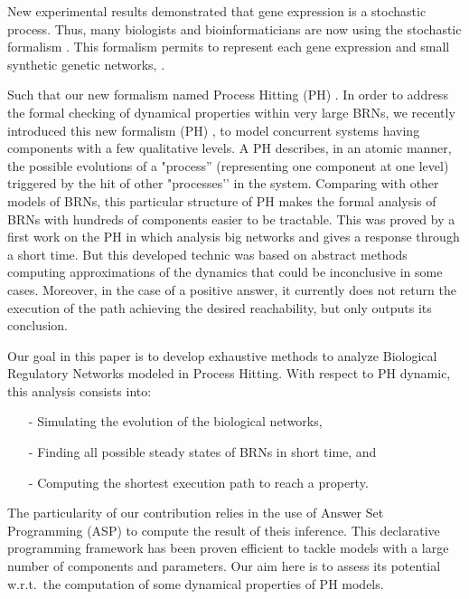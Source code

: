 New experimental results \cite{elowitz2002stochastic} \cite{blake2003noise} demonstrated that gene expression is a stochastic process. Thus, many biologists and bioinformaticians are now using the stochastic formalism \cite{arkin1998stochastic, tian2006stochastic, wang2010robust}. This formalism permits to represent each gene expression \cite{raser2005noise} and small synthetic genetic networks, \cite{elowitz2000synthetic} \cite{gardner2000construction}.

 Such that our new formalism named Process Hitting (PH) \cite{PMR10-TCSB}. In order to address the formal checking of dynamical properties within very large BRNs, we recently introduced this new formalism (PH) \cite{PMR10-TCSB}, to model concurrent systems having components with a few qualitative levels. A PH describes, in an atomic manner, the possible evolutions of a "process'' (representing one component at one level) triggered by the hit of other "processes’’ in the system. Comparing with other models of BRNs, this particular structure of PH makes the formal analysis of BRNs with hundreds of components easier to be tractable. This was proved by a first work on the PH in \cite{PMR10-TCSB,PMR12-MSCS} which analysis big networks and gives a response through a short time. But this developed technic was based on abstract methods computing approximations of the dynamics that could be inconclusive in some cases. Moreover, in the case of a positive answer, it currently does not return the execution of the path achieving the desired reachability, but only outputs its conclusion.

Our goal in this paper is to develop exhaustive methods to analyze Biological Regulatory Networks modeled in Process Hitting. With respect to PH dynamic, this analysis consists into:
\begin{itemize}
\item[-] Simulating the evolution of the biological networks,
\item[-] Finding all possible steady states of BRNs in short time, and
\item[-] Computing the shortest execution path to reach a property.
\end{itemize}

 The particularity of our contribution relies in the use of Answer Set Programming
(ASP) \cite{baral2003knowledge}
to compute the result of theis inference.
This declarative programming framework has been proven efficient
to tackle models with a large number of components and parameters.
Our aim here is to assess its potential w.r.t.\ the computation
of some dynamical properties of PH models.
